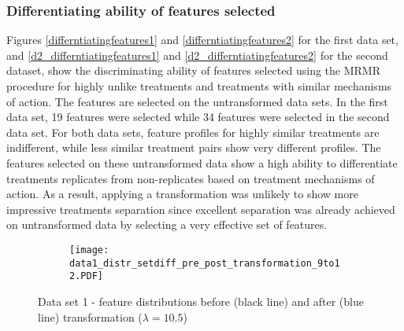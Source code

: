 \documentclass[11pt]{article}
\begin{document}
\subsubsection*{Differentiating ability of features selected}
\par{Figures \ref{differntiatingfeatures1} and \ref{differntiatingfeatures2} for the first data set, and  \ref{d2_differntiatingfeatures1} and \ref{d2_differntiatingfeatures2} for the second dataset, show the discriminating ability of features selected using the MRMR procedure for highly unlike treatments and treatments with similar mechanisms of action. The features are selected on the untransformed data sets. In the first data set, 19 features were selected while 34 features were selected in the second data set. For both data sets, feature profiles for highly similar treatments are indifferent, while less similar treatment pairs show very different profiles. The features selected on these untransformed data show a high ability to differentiate treatments replicates from non-replicates based on treatment mechanisms of action. As a result, applying a transformation was unlikely to show more impressive treatments separation since excellent separation was already achieved on untransformed data by selecting a very effective set of features. }
\\

\begin{figure}[ht!]
\centering
  \begin{subfigure}[b]{0.8\linewidth}
  \centering
\texttt{[image: data1\_distr\_setdiff\_pre\_post\_transformation\_9to12.PDF]}
\vspace{1ex}
 \end{subfigure}%
\caption{Data set 1 - feature distributions before (black line) and after (blue line) transformation ($\lambda = 10.5$)}
\label{distdata1}
\end{figure}

\end{document}
